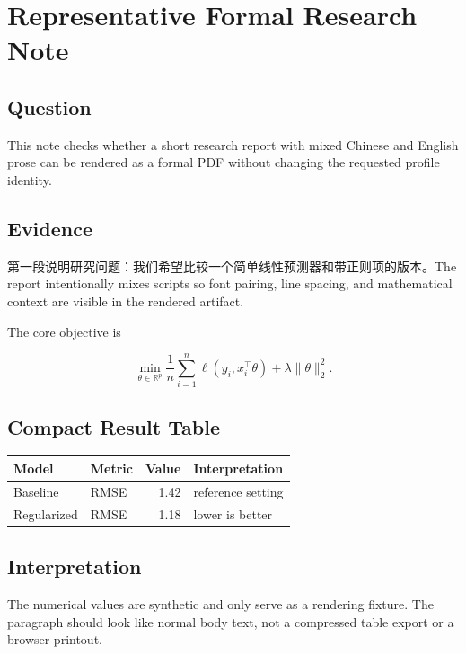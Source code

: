 \documentclass[
  11pt,
  a4paper,
]{article}
\author{}
\date{}
\begin{document}
\hypertarget{representative-formal-research-note}{%
\section{Representative Formal Research
Note}\label{representative-formal-research-note}}

\hypertarget{question}{%
\subsection{Question}\label{question}}

This note checks whether a short research report with mixed Chinese and
English prose can be rendered as a formal PDF without changing the
requested profile identity.

\hypertarget{evidence}{%
\subsection{Evidence}\label{evidence}}

第一段说明研究问题：我们希望比较一个简单线性预测器和带正则项的版本。The
report intentionally mixes scripts so font pairing, line spacing, and
mathematical context are visible in the rendered artifact.

The core objective is

\[
\min_{\theta \in \mathbb{R}^{p}}
\frac{1}{n}\sum_{i=1}^{n}\ell(y_i, x_i^\top\theta) + \lambda \|\theta\|_2^2.
\]

\hypertarget{compact-result-table}{%
\subsection{Compact Result Table}\label{compact-result-table}}

\begin{longtable}[]{@{}llrl@{}}
\toprule
Model & Metric & Value & Interpretation \\
\midrule
\endhead
Baseline & RMSE & 1.42 & reference setting \\
Regularized & RMSE & 1.18 & lower is better \\
\bottomrule
\end{longtable}

\hypertarget{interpretation}{%
\subsection{Interpretation}\label{interpretation}}

The numerical values are synthetic and only serve as a rendering
fixture. The paragraph should look like normal body text, not a
compressed table export or a browser printout.
\end{document}
